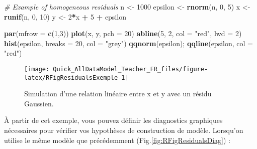 \documentclass[french,a4paper]{article}
\newenvironment{Shaded}{\begin{snugshade}}{\end{snugshade}}
\newcommand{\CommentTok}[1]{\textcolor[rgb]{0.56,0.35,0.01}{\textit{#1}}}
\newcommand{\DataTypeTok}[1]{\textcolor[rgb]{0.13,0.29,0.53}{#1}}
\newcommand{\DecValTok}[1]{\textcolor[rgb]{0.00,0.00,0.81}{#1}}
\newcommand{\KeywordTok}[1]{\textcolor[rgb]{0.13,0.29,0.53}{\textbf{#1}}}
\newcommand{\NormalTok}[1]{#1}
\newcommand{\OperatorTok}[1]{\textcolor[rgb]{0.81,0.36,0.00}{\textbf{#1}}}
\newcommand{\StringTok}[1]{\textcolor[rgb]{0.31,0.60,0.02}{#1}}
\begin{document}
\begin{Shaded}
\begin{Highlighting}[]
\CommentTok{# Example of homogeneous residuals}
\NormalTok{n <-}\StringTok{ }\DecValTok{1000}
\NormalTok{epsilon <-}\StringTok{ }\KeywordTok{rnorm}\NormalTok{(n, }\DecValTok{0}\NormalTok{, }\DecValTok{5}\NormalTok{)}
\NormalTok{x <-}\StringTok{ }\KeywordTok{runif}\NormalTok{(n, }\DecValTok{0}\NormalTok{, }\DecValTok{10}\NormalTok{)}
\NormalTok{y <-}\StringTok{ }\DecValTok{2}\OperatorTok{*}\NormalTok{x }\OperatorTok{+}\StringTok{ }\DecValTok{5} \OperatorTok{+}\StringTok{ }\NormalTok{epsilon}

\KeywordTok{par}\NormalTok{(}\DataTypeTok{mfrow =} \KeywordTok{c}\NormalTok{(}\DecValTok{1}\NormalTok{,}\DecValTok{3}\NormalTok{))}
\KeywordTok{plot}\NormalTok{(x, y, }\DataTypeTok{pch =} \DecValTok{20}\NormalTok{)}
\KeywordTok{abline}\NormalTok{(}\DecValTok{5}\NormalTok{, }\DecValTok{2}\NormalTok{, }\DataTypeTok{col =} \StringTok{"red"}\NormalTok{, }\DataTypeTok{lwd =} \DecValTok{2}\NormalTok{)}
\KeywordTok{hist}\NormalTok{(epsilon, }\DataTypeTok{breaks =} \DecValTok{20}\NormalTok{, }\DataTypeTok{col =} \StringTok{"grey"}\NormalTok{)}
\KeywordTok{qqnorm}\NormalTok{(epsilon); }\KeywordTok{qqline}\NormalTok{(epsilon, }\DataTypeTok{col =} \StringTok{"red"}\NormalTok{)}
\end{Highlighting}
\end{Shaded}

\begin{figure}[!h]

{\centering \texttt{[image: Quick\_AllDataModel\_Teacher\_FR\_files/figure-latex/RFigResidualsExemple-1]} 

}

\caption{Simulation d'une relation linéaire entre x
et y avec un résidu Gaussien.}\label{fig:RFigResidualsExemple}
\end{figure}

À partir de cet exemple, vous pouvez définir les diagnostics graphiques
nécessaires pour vérifier vos hypothèses de construction de modèle.
Lorsqu'on utilise le même modèle que précédemment
(Fig.\ref{fig:RFigResidualsDiag}) :
\end{document}

